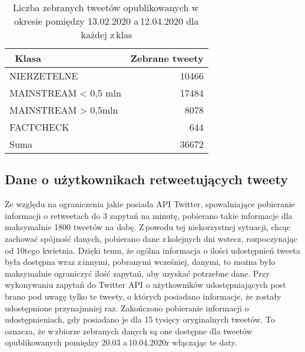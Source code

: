 \begin{table}[!h] \label{tab:zebranetweety} \centering
\caption{Liczba zebranych tweetów opublikowanych w\,okresie pomiędzy 13.02.2020 a\,12.04.2020 dla każdej z\,klas}
\begin{tabular}{|l|r|} 
\hline
~Klasa & Zebrane tweety \\ 
\hline \hline
NIERZETELNE & 10466 \\ 
\hline
MAINSTREAM \textless{} 0,5 mln & 17484 \\ 
\hline
MAINSTREAM \textgreater{} 0,5mln & 8078 \\ 
\hline
FACTCHECK & 644 \\
\hline 
Suma & 36672 \\
\hline 
\end{tabular}

\end{table}

\subsection{Dane o użytkownikach retweetujących tweety}
Ze względu na ograniczenia jakie posiada API Twitter, spowalniające pobieranie informacji o retweetach do 3 zapytań na minutę, pobierano takie informacje dla maksymalnie 1800 tweetów na dobę. Z\,powodu tej niekorzystnej sytuacji, chcąc zachować spójność danych, pobierano dane z\,kolejnych dni wstecz, rozpoczynając od 10tego kwietnia. Dzięki temu, że ogólna informacja o ilości udostępnień tweeta była dostępna wraz z\,innymi, pobranymi wcześniej, danymi, to można było maksymalnie ograniczyć ilość zapytań, aby uzyskać potrzebne dane. Przy wykonywaniu zapytań do Twitter API o użytkowników udostępniających post brano pod uwagę tylko te tweety, o których posiadano informacje, że zostały udostępnione przynajmniej raz. Zakończono pobieranie informacji o udostępnieniach, gdy posiadano je dla 15 tysięcy oryginalnych tweetów. To oznacza, że w\,zbiorze zebranych danych są one dostępne dla tweetów opublikowanych pomiędzy 20.03 a\,10.04.2020r włączając te daty.  